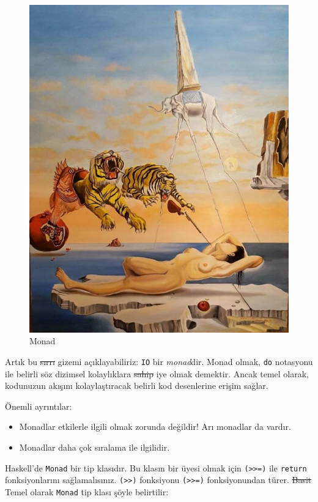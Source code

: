 \documentclass[a4paper,14pt,openany]{extbook} %
\let\emph\textit
\begin{document}
\begin{figure}[htbp]
  \centering
  \includegraphics{img/dali-reve.jpg}
  \caption{Monad}
\end{figure}

Artık bu \st{sırrı} gizemi açıklayabiliriz: \lstinline!IO! bir \emph{monad}dir.
Monad olmak, \lstinline!do! notasyonu ile belirli söz dizimsel
kolaylıklara \st{sahip} iye olmak demektir. Ancak temel olarak, kodunuzun akışını
kolaylaştıracak belirli kod desenlerine erişim sağlar.

  Önemli ayrıntılar:
  \begin{itemize}
  \item Monadlar etkilerle ilgili olmak zorunda değildir! Arı  monadlar da vardır.
  \item Monadlar daha çok sıralama ile ilgilidir.
  \end{itemize}
  
Haskell'de \lstinline!Monad! bir tip klasıdır. Bu klasın bir üyesi
olmak için \lstinline!(>>=)! ile \lstinline!return! fonksiyonlarını
sağlamalısınız. \lstinline!(>>)! fonksiyonu \lstinline!(>>=)!
fonksiyonundan türer. \st{Basit} Temel olarak \lstinline!Monad! tip klası şöyle
belirtilir:
\end{document}
